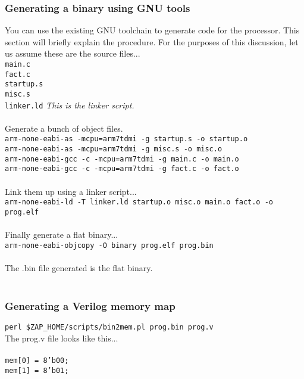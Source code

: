 \documentclass[11pt]{article}
\begin{document}
\subsubsection{Generating a binary using GNU tools}
You can use the existing GNU toolchain to generate code for the processor. This
section will briefly explain the procedure. For the purposes of this 
discussion, let us assume these are the source files...\\
\texttt{main.c} \\
\texttt{fact.c} \\
\texttt{startup.s} \\
\texttt{misc.s} \\
\texttt{linker.ld}  \emph{ This is the linker script.} \\\\
Generate a bunch of object files.\\
\texttt{arm-none-eabi-as -mcpu=arm7tdmi -g startup.s -o startup.o} \\
\texttt{arm-none-eabi-as -mcpu=arm7tdmi -g misc.s -o misc.o} \\
\texttt{arm-none-eabi-gcc -c -mcpu=arm7tdmi -g main.c -o main.o} \\
\texttt{arm-none-eabi-gcc -c -mcpu=arm7tdmi -g fact.c -o fact.o} \\\\
Link them up using a linker script...\\
\texttt{arm-none-eabi-ld -T linker.ld startup.o misc.o main.o fact.o -o prog.elf} \\\\
Finally generate a flat binary...\\
\texttt{arm-none-eabi-objcopy -O binary prog.elf prog.bin} \\\\
The .bin file generated is the flat binary.\\\\


\subsubsection{Generating a Verilog memory map}
\texttt{perl \$ZAP\_HOME/scripts/bin2mem.pl prog.bin prog.v}\\
The prog.v file looks like this...\\\\
\texttt{mem[0] = 8'b00;} \\
\texttt{mem[1] = 8'b01;} \\\\
\end{document}
